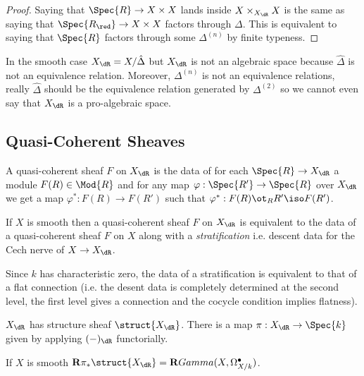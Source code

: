 \documentclass[12pt]{article}
\begin{document}
\begin{proof}
Saying that $\Spec{R} \to X \times X$ lands inside $X \times_{X_{\dR}} X$ is the same as saying that $\Spec{R_{\red}} \to X \times X$ factors through $\Delta$. This is equivalent to saying that $\Spec{R}$ factors through some $\Delta^{(n)}$ by finite typeness. 
\end{proof}

\begin{rmk}
In the smooth case $X_{\dR} = X / \hat{\Delta}$ but $X_{\dR}$ is not an algebraic space because $\hat{\Delta}$ is not an \etale equivalence relation. Moreover, $\Delta^{(n)}$ is not an equivalence relations, really $\hat{\Delta}$ should be the equivalence relation generated by $\Delta^{(2)}$ so we cannot even say that $X_{\dR}$ is a pro-algebraic space.
\end{rmk}

\subsection{Quasi-Coherent Sheaves}

A quasi-coherent sheaf $F$ on $X_{\dR}$ is the data of for each $\Spec{R} \to X_{\dR}$ a module $F(R) \in \Mod{R}$ and for any map $\varphi : \Spec{R'} \to \Spec{R}$ over $X_{\dR}$ we get a map $\varphi^* : F(R) \to F(R')$ such that $\varphi^* : F(R) \ot_R R' \iso F(R')$.

\begin{prop}
If $X$ is smooth then a quasi-coherent sheaf $F$ on $X_{\dR}$ is equivalent to the data of a quasi-coherent sheaf $F$ on $X$ along with a \textit{stratification} i.e. descent data for the Cech nerve of $X \to X_{\dR}$. 
\end{prop}

\begin{prop}
Since $k$ has characteristic zero, the data of a stratification is equivalent to that of a flat connection (i.e. the desent data is completely determined at the second level, the first level gives a connection and the cocycle condition implies flatness). 
\end{prop}

\begin{rmk}
$X_{\dR}$ has structure sheaf $\struct{X_{\dR}}$. There is a map $\pi : X_{\dR} \to \Spec{k}$ given by applying $(-)_{\dR}$ functorially.
\end{rmk}

\begin{theorem}
If $X$ is smooth $\R \pi_* \struct{X_{\dR}} = \R \\Gamma(X, \Omega^\bullet_{X/k})$.
\end{theorem}
\end{document}
